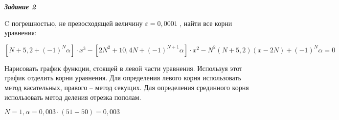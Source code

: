 \documentclass[12pt]{article}
\begin{document}
\begin{center}
	\textbf{\textit{Задание 2}}
\end{center}

C погрешностью, не превосходящей величину $\varepsilon = 0,0001$
, найти все корни уравнения: 

$[N+5,2+(-1)^N\alpha] \cdot x^3 - [2N^2 + 10,4N + (-1)^{N+1}\alpha] \cdot x^2 -
N^2(N+5,2)(x-2N) +(-1)^N \alpha = 0$

Нарисовать график функции, стоящей в левой части уравнения. Используя этот
график отделить корни уравнения. Для определения левого корня использовать метод
касательных, правого – метод секущих. Для определения срединного корня использовать
метод деления отрезка пополам.

$N = 1, \alpha = 0,003 \cdot (51-50) = 0,003$
\end{document}
